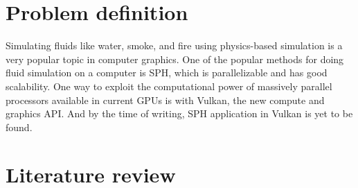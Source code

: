 \documentclass[a4paper, 12pt, oneside]{book}
\begin{document}
\section{Problem definition}

\begin{doublespace}
    Simulating fluids like water, smoke, and fire using physics-based simulation is a very popular topic in computer graphics. One of the popular methods for doing fluid simulation on a computer is SPH, which is parallelizable and has good scalability. One way to exploit the computational power of massively parallel processors available in current GPUs is with Vulkan, the new compute and graphics API. And by the time of writing, SPH application in Vulkan is yet to be found.
\end{doublespace}

\section{Literature review}
\end{document}
